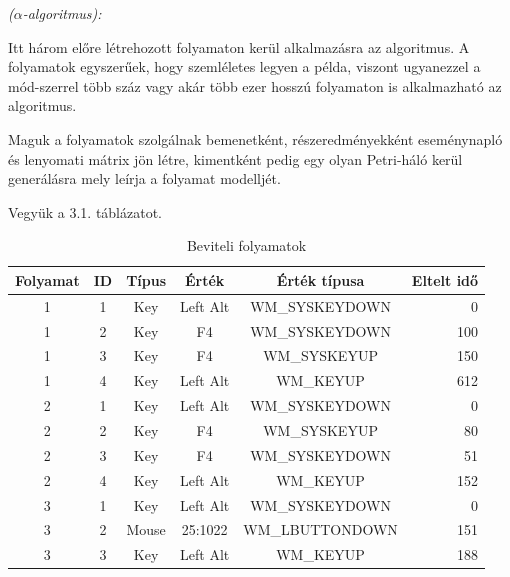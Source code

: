 \begin{definition}{\textit{($\alpha$-algoritmus):}}
\begin{enumerate}
\end{enumerate}

\cite{article:001}
\end{definition}

\begin{example}
	Itt három előre létrehozott folyamaton kerül alkalmazásra az algoritmus. A folyamatok egyszerűek, hogy szemléletes legyen a példa, viszont ugyanezzel a mód\hyp{}szerrel több száz vagy akár több ezer hosszú folyamaton is alkalmazható az algoritmus.
	
	Maguk a folyamatok szolgálnak bemenetként, részeredményekként eseménynapló és lenyomati mátrix jön létre, kimentként pedig egy olyan Petri-háló kerül generálásra mely leírja a folyamat modelljét.

	Vegyük a 3.1. táblázatot.
	\newpage

	\begin{table}[h!]
	\begin{center}
	\caption{Beviteli folyamatok}
	\begin{tabular}{|| c | c | c | c | c | r ||}
		\hline\hline
		\textbf{Folyamat} & \textbf{ID} & \textbf{Típus} & \textbf{Érték} & \textbf{Érték típusa} &  \textbf{Eltelt idő} \\ [0.5ex]
		\hline\hline
		1 & 1 & Key&  Left Alt & WM\_SYSKEYDOWN & 0 \\
		\hline
		1 & 2 & Key&  F4 & WM\_SYSKEYDOWN & 100 \\
		\hline
		1 & 3 & Key&  F4 & WM\_SYSKEYUP & 150 \\
		\hline
		1 & 4 & Key&  Left Alt & WM\_KEYUP & 612 \\
		\hline\hline
		2 & 1 & Key & Left Alt & WM\_SYSKEYDOWN & 0 \\
		\hline
		2 & 2 & Key & F4 & WM\_SYSKEYUP & 80 \\
		\hline
		2 & 3 & Key & F4 & WM\_SYSKEYDOWN & 51 \\
		\hline
		2 & 4 & Key & Left Alt & WM\_KEYUP & 152 \\
		\hline\hline
		3 & 1 & Key & Left Alt & WM\_SYSKEYDOWN & 0 \\
		\hline
		3 & 2 & Mouse & 25:1022 & WM\_LBUTTONDOWN & 151 \\
		\hline
		3 & 3 & Key & Left Alt & WM\_KEYUP & 188 \\
		\hline\hline
	\end{tabular}
	\label{fig:planexample}
	\end{center}
	\end{table}	


\end{example}
